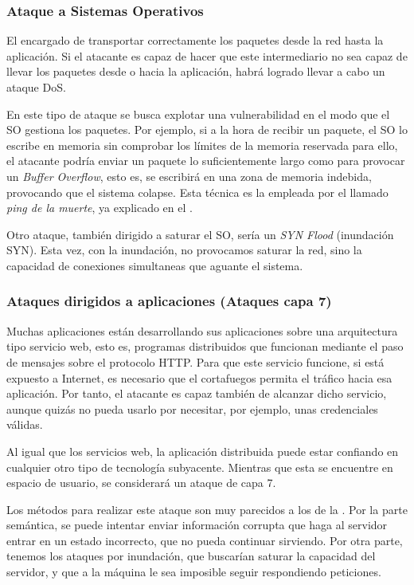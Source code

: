 \subsubsection{Ataque a Sistemas Operativos}

El encargado de transportar correctamente los paquetes desde la red hasta la aplicación. Si el atacante es capaz de 
hacer que este intermediario no sea capaz de llevar los paquetes desde o hacia la aplicación, habrá logrado llevar a 
cabo un ataque \gls{DoS}.

En este tipo de ataque se busca explotar una vulnerabilidad en el modo que el \gls{SO} gestiona los paquetes. Por 
ejemplo, si a la hora de recibir un paquete, el \gls{SO} lo escribe en memoria sin comprobar los límites de la memoria 
reservada para ello, el atacante podría enviar un paquete lo suficientemente largo como para provocar un \emph{Buffer 
Overflow}, esto es, se escribirá en una zona de memoria indebida, provocando que el sistema 
colapse. Esta técnica es la empleada por el llamado \emph{ping de la muerte}, ya explicado en 
el .

Otro ataque, también dirigido a saturar el \gls{SO}, sería un \emph{\gls{SYN} Flood} (inundación \gls{SYN}). Esta vez, 
con la inundación, no provocamos saturar la red, sino la capacidad de conexiones simultaneas que aguante el sistema.

\subsubsection{Ataques dirigidos a aplicaciones (Ataques capa 7)}

Muchas aplicaciones están desarrollando sus aplicaciones sobre una arquitectura tipo servicio web, esto es, programas 
distribuidos que funcionan mediante el paso de mensajes sobre el protocolo HTTP. Para que este servicio funcione, si 
está expuesto a Internet, es necesario que el cortafuegos permita el tráfico hacia esa aplicación. Por tanto, el 
atacante es capaz también de alcanzar dicho servicio, aunque quizás no pueda usarlo por necesitar, por ejemplo, unas 
credenciales válidas.

Al igual que los servicios web, la aplicación distribuida puede estar confiando en cualquier otro tipo de tecnología 
subyacente. Mientras que esta se encuentre en espacio de usuario, se considerará un ataque de capa 7.

Los métodos para realizar este ataque son muy parecidos a los de la . Por la parte semántica, se 
puede intentar enviar información corrupta que haga al servidor entrar en un estado incorrecto, que no pueda continuar 
sirviendo. Por otra parte, tenemos los ataques por inundación, que buscarían saturar la capacidad del servidor, y que 
a la máquina le sea imposible seguir respondiendo peticiones.


